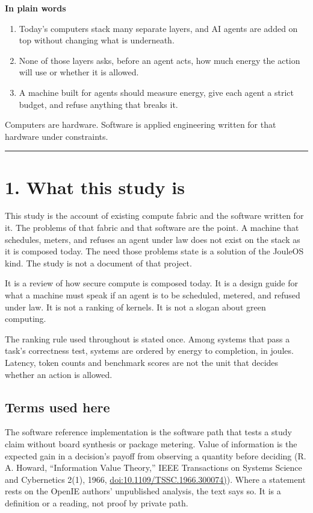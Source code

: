 \documentclass[10pt,letterpaper]{article}
\providecommand{\tightlist}{\setlength{\itemsep}{1pt}\setlength{\parskip}{0pt}}
\begin{document}
\textbf{In plain words}

\begin{enumerate}
\def\labelenumi{\arabic{enumi}.}
\tightlist
\item
  Today's computers stack many separate layers, and AI agents are added
  on top without changing what is underneath.
\item
  None of those layers asks, before an agent acts, how much energy the
  action will use or whether it is allowed.
\item
  A machine built for agents should measure energy, give each agent a
  strict budget, and refuse anything that breaks it.
\end{enumerate}

Computers are hardware. Software is applied engineering written for that
hardware under constraints.

\begin{center}\rule{0.5\linewidth}{0.5pt}\end{center}

\section{1. What this study is}\label{what-this-study-is}

This study is the account of existing compute fabric and the software
written for it. The problems of that fabric and that software are the
point. A machine that schedules, meters, and refuses an agent under law
does not exist on the stack as it is composed today. The need those
problems state is a solution of the JouleOS kind. The study is not a
document of that project.

It is a review of how secure compute is composed today. It is a design
guide for what a machine must speak if an agent is to be scheduled,
metered, and refused under law. It is not a ranking of kernels. It is
not a slogan about green computing.

The ranking rule used throughout is stated once. Among systems that pass
a task's correctness test, systems are ordered by energy to completion,
in joules. Latency, token counts and benchmark scores are not the unit
that decides whether an action is allowed.

\subsection{Terms used here}\label{terms-used-here}

The software reference implementation is the software path that tests a
study claim without board synthesis or package metering. Value of
information is the expected gain in a decision's payoff from observing a
quantity before deciding (R. A. Howard, ``Information Value Theory,''
IEEE Transactions on Systems Science and Cybernetics 2(1), 1966,
\href{https://doi.org/10.1109/TSSC.1966.300074}{doi:10.1109/TSSC.1966.300074)}).
Where a statement rests on the OpenIE authors' unpublished analysis, the
text says so. It is a definition or a reading, not proof by private
path.
\end{document}
